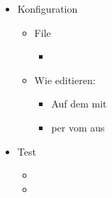 \begin{frame}{\target}{}
 \begin{itemize}
  \item Konfiguration \targetS
  \begin{itemize}
   \item File 
   \begin{itemize}
    \item {}
   \end{itemize}
    \item Wie editieren:
    \begin{itemize}
     \item Auf dem \targetS mit 
     \item per  vom \host aus
    \end{itemize}
  \end{itemize}
  \item Test
  \begin{itemize}
   \item {}
   \item {}
  \end{itemize}
 \end{itemize}
\end{frame}
